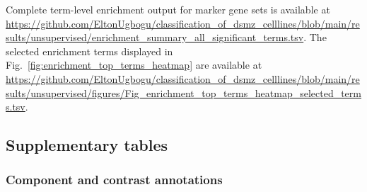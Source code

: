 Complete term-level enrichment output for marker gene sets is available at
\url{https://github.com/EltonUgbogu/classification_of_dsmz_celllines/blob/main/results/unsupervised/enrichment_summary_all_significant_terms.tsv}.
The selected enrichment terms displayed in Fig.~\ref{fig:enrichment_top_terms_heatmap}
are available at
\url{https://github.com/EltonUgbogu/classification_of_dsmz_celllines/blob/main/results/unsupervised/figures/Fig_enrichment_top_terms_heatmap_selected_terms.tsv}.

\clearpage
\subsection{Supplementary tables}

\subsubsection{Component and contrast annotations}

